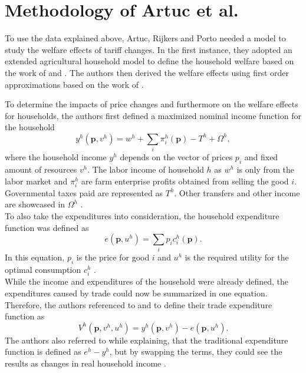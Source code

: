 \section{Methodology of Artuc et al.}

To use the data explained above, Artuc, Rijkers and Porto needed a model to study the welfare effects of tariff changes. In the
first instance, they adopted an extended agricultural household model to define the household welfare based on the work of \cite{Singh.1986} 
and \cite{Benjamin.1993}. The authors then derived the welfare effects using first order
approximations based on the work of \cites{Deaton.1989}{Porto.2006}{Nicita.2014}.

To determine the impacts of price changes and furthermore on the welfare effects for households, the authors first defined a 
maximized nominal income function for the household 
\begin{equation} \label{eq:equation1}
    y^h(\mathbf{p}, v^h)= w^h + \sum_{ i}\pi_{i}^{h}(\mathbf{p})-T^h+\Omega^h,
\end{equation}
where the household income \(y^h\) depends on the vector of prices \(p_{i}\) and fixed amount of resources \(v^h\).
The labor income of household \(h\) as \(w^h\) is only from the labor market and \(\pi_{i}^{h}\) are farm enterprise profits
obtained from selling the good \(i\).  Governmental taxes paid are represented as \(T^h\). Other transfers and other income are
showcased in \(\Omega^h\) \parencite[pp.~4-5]{Artuc.2019}. \\
To also take the expenditures into consideration, the household expenditure function was defined as 
\begin{equation} \label{eq:equation2}
    e(\mathbf{p}, u^h)= \sum_{i}p_{i}c_{i}^h(\mathbf{p}).
\end{equation}
In this equation, \(p_{i}\) is the price for good \(i\) and \(u^h\) is the required utility for the optimal consumption
\(c_{i}^h\) \parencite[p.~5]{Artuc.2019}.\\
While the income and expenditures of the household were already defined, the expenditures caused by trade could now be summarized
in one equation. Therefore, the authors referenced to \cite{Dixit.1980} and \cite{Anderson.1996} to define their
trade expenditure function as 
\begin{equation} \label{eq:equation3}
    V^h(\mathbf{p}, v^h, u^h)= y^h(\mathbf{p}, v^h) - e(\mathbf{p}, u^h).
\end{equation} 
The authors also referred to \cite{Porto.2006} while explaining, that the traditional expenditure function is defined as \(e^h-y^h\), but
by swapping the terms, they could see the results as changes in real household income \parencite[p.~5]{Artuc.2019}.\\


